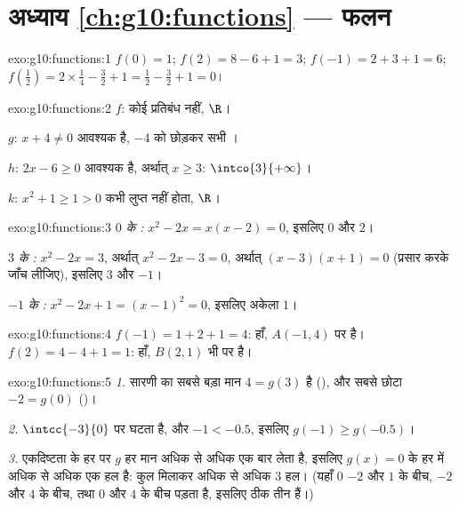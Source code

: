 \section*{अध्याय \ref{ch:g10:functions} --- फलन}

\begin{solution}{exo:g10:functions:1}
$f(0) = 1$; \quad $f(2) = 8 - 6 + 1 = 3$; \quad
$f(-1) = 2 + 3 + 1 = 6$; \quad
$f\!\left(\tfrac12\right) = 2 \times \tfrac14 - \tfrac32 + 1 = \tfrac12 -
\tfrac32 + 1 = 0$।
\end{solution}

\begin{solution}{exo:g10:functions:2}
$f$: कोई प्रतिबंध नहीं,  $\R$।

$g$: $x + 4 \neq 0$ आवश्यक है,  $-4$ को छोड़कर सभी ।

$h$: $2x - 6 \geq 0$ आवश्यक है, अर्थात् $x \geq 3$:  $\intco{3}{+\infty}$।

$k$: $x^2 + 1 \geq 1 > 0$ कभी लुप्त नहीं होता,  $\R$।
\end{solution}

\begin{solution}{exo:g10:functions:3}
\emph{$0$ के :} $x^2 - 2x = x(x-2) = 0$, इसलिए $0$ और $2$।

\emph{$3$ के :} $x^2 - 2x = 3$, अर्थात् $x^2 - 2x - 3 = 0$, अर्थात् $(x-3)(x+1) = 0$ (प्रसार
करके जाँच लीजिए), इसलिए $3$ और $-1$।

\emph{$-1$ के :} $x^2 - 2x + 1 = (x - 1)^2 = 0$, इसलिए अकेला  $1$।
\end{solution}

\begin{solution}{exo:g10:functions:4}
$f(-1) = 1 + 2 + 1 = 4$: हाँ, $A(-1, 4)$  पर है।
$f(2) = 4 - 4 + 1 = 1$: हाँ, $B(2, 1)$ भी  पर है।
\end{solution}

\begin{solution}{exo:g10:functions:5}
\emph{1.} सारणी का सबसे बड़ा मान $4 = g(3)$ है (), और सबसे छोटा $-2 = g(0)$
()।

\emph{2.} $\intcc{-3}{0}$ पर  घटता है, और $-1 < -0.5$, इसलिए $g(-1) \geq g(-0.5)$।

\emph{3.} एकदिष्टता के हर  पर $g$ हर मान अधिक से अधिक एक बार लेता
है, इसलिए $g(x) = 0$ के हर  में अधिक से अधिक एक हल है: कुल मिलाकर अधिक से
अधिक $3$ हल। (यहाँ $0$ $-2$ और $1$ के बीच, $-2$ और $4$ के बीच, तथा
$0$ और $4$ के बीच पड़ता है, इसलिए ठीक तीन हैं।)
\end{solution}

